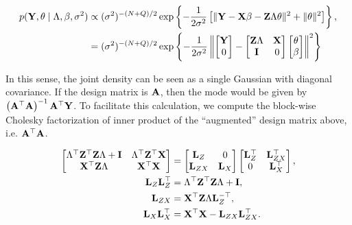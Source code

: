 \documentclass[10pt]{article}
\begin{document}
\begin{align*}
p({\bf Y}, \theta \mid \Lambda, \beta, \sigma^2) & \propto
(\sigma^2)^{-(N + Q)/2}\exp\left\{
-\frac{1}{2\sigma^2}\left[ \|{\bf Y} - {\bf X}\beta - {\bf Z}\Lambda \theta\|^2 +
  \|\theta\|^2  \right]
\right\}, \\
%
& = (\sigma^2)^{-(N + Q)/2}\exp\left\{
-\frac{1}{2\sigma^2}\left\|
\begin{bmatrix} {\bf Y} \\ 0 \end{bmatrix} -
\begin{bmatrix} {\bf Z}\Lambda & {\bf X} \\
{\bf I} & 0 \end{bmatrix}
\begin{bmatrix} \theta \\ \beta \end{bmatrix}
\right\|^2
\right\}
\end{align*}

In this sense, the joint density can be seen as a single
Gaussian with diagonal covariance. If the design matrix is ${\bf A}$, then the
mode would be given by $\left({\bf A}^\top{\bf A}\right)^{-1}{\bf
  A}^\top{\bf Y}$. To facilitate this calculation, we compute the
block-wise Cholesky factorization of inner product of the ``augmented'' design matrix
above, i.e. ${\bf A}^\top{\bf A}$.

\begin{align*}
\begin{bmatrix}
\Lambda^\top {\bf Z}^\top {\bf Z}\Lambda + {\bf I} & \Lambda^\top {\bf
  Z}^\top {\bf X} \\
  {\bf X}^\top {\bf Z}\Lambda & {\bf X}^\top{\bf X}\end{bmatrix} & =
\begin{bmatrix} {\bf L}_Z & 0 \\ {\bf L}_{ZX} & {\bf
    L}_{X} \end{bmatrix}
\begin{bmatrix} {\bf L}^\top_Z & {\bf L}^\top_{ZX} \\ 0 & {\bf
    L}^\top_{X} \end{bmatrix}, \\
{\bf L}_Z{\bf L}_Z^\top & = \Lambda^\top {\bf Z}^\top {\bf Z}\Lambda +
{\bf I}, \\
{\bf L}_{ZX} & = {\bf X}^\top{\bf Z}\Lambda{\bf L}_Z^{-\top}, \\
{\bf L}_X{\bf L}_X^\top & = {\bf X}^\top{\bf X} - {\bf L}_{ZX}{\bf L}_{ZX}^\top.
\end{align*}
\end{document}
